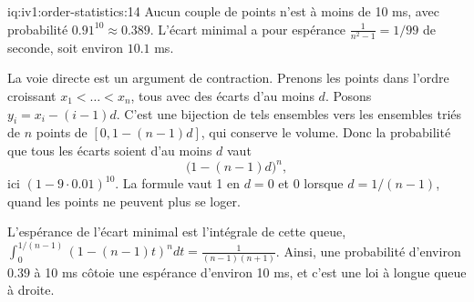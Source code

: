 \begin{solution}{iq:iv1:order-statistics:14}
Aucun couple de points n'est à moins de 10 ms, avec probabilité $0.91^{10} \approx 0.389$. L'écart minimal a pour espérance $\frac{1}{n^2 - 1} = 1/99$ de seconde, soit environ $10.1$ ms.

La voie directe est un argument de contraction. Prenons les points dans l'ordre croissant $x_1 < \dots < x_n$, tous avec des écarts d'au moins $d$. Posons $y_i = x_i - (i - 1)d$. C'est une bijection de tels ensembles vers les ensembles triés de $n$ points de $[0, 1 - (n - 1)d]$, qui conserve le volume. Donc la probabilité que tous les écarts soient d'au moins $d$ vaut
\[
\bigl(1 - (n - 1)d\bigr)^n,
\]
ici $(1 - 9 \cdot 0.01)^{10}$. La formule vaut 1 en $d = 0$ et 0 lorsque $d = 1/(n - 1)$, quand les points ne peuvent plus se loger.

L'espérance de l'écart minimal est l'intégrale de cette queue, $\int_0^{1/(n - 1)} (1 - (n - 1)t)^n dt = \frac{1}{(n - 1)(n + 1)}$. Ainsi, une probabilité d'environ $0.39$ à 10 ms côtoie une espérance d'environ 10 ms, et c'est une loi à longue queue à droite.

\end{solution}

